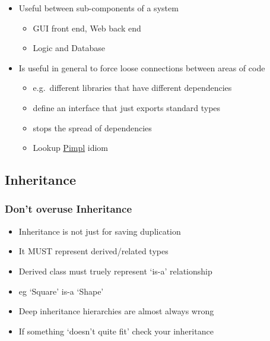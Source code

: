 \begin{itemize}
\itemsep1pt\parskip0pt
\item
  Useful between sub-components of a system

  \begin{itemize}
  \itemsep1pt\parskip0pt
  \item
    GUI front end, Web back end
  \item
    Logic and Database
  \end{itemize}
\item
  Is useful in general to force loose connections between areas of code

  \begin{itemize}
  \itemsep1pt\parskip0pt
  \item
    e.g.~different libraries that have different dependencies
  \item
    define an interface that just exports standard types
  \item
    stops the spread of dependencies
  \item
    Lookup \href{http://en.cppreference.com/w/cpp/language/pimpl}{Pimpl}
    idiom
  \end{itemize}
\end{itemize}

\subsection{Inheritance}\label{inheritance-1}

\subsubsection{Don't overuse
Inheritance}\label{dont-overuse-inheritance}

\begin{itemize}
\itemsep1pt\parskip0pt
\item
  Inheritance is not just for saving duplication
\item
  It MUST represent derived/related types
\item
  Derived class must truely represent `is-a' relationship
\item
  eg `Square' is-a `Shape'
\item
  Deep inheritance hierarchies are almost always wrong
\item
  If something `doesn't quite fit' check your inheritance
\end{itemize}

